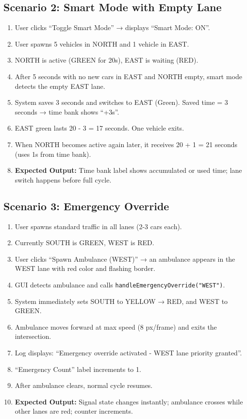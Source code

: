 \documentclass[12pt,a4paper]{article}
\begin{document}
\subsection{Scenario 2: Smart Mode with Empty Lane}
\begin{enumerate}
    \item User clicks ``Toggle Smart Mode'' → displays ``Smart Mode: ON''.
    \item User spawns 5 vehicles in NORTH and 1 vehicle in EAST.
    \item NORTH is active (GREEN for 20s), EAST is waiting (RED).
    \item After 5 seconds with no new cars in EAST and NORTH empty, smart mode detects the empty EAST lane.
    \item System saves 3 seconds and switches to EAST (Green). Saved time = 3 seconds → time bank shows ``+3s''.
    \item EAST green lasts 20 - 3 = 17 seconds. One vehicle exits.
    \item When NORTH becomes active again later, it receives 20 + 1 = 21 seconds (uses 1s from time bank).
    \item \textbf{Expected Output:} Time bank label shows accumulated or used time; lane switch happens before full cycle.
\end{enumerate}

\subsection{Scenario 3: Emergency Override}
\begin{enumerate}
    \item User spawns standard traffic in all lanes (2-3 cars each).
    \item Currently SOUTH is GREEN, WEST is RED.
    \item User clicks ``Spawn Ambulance (WEST)'' → an ambulance appears in the WEST lane with red color and flashing border.
    \item GUI detects ambulance and calls \texttt{handleEmergencyOverride("WEST")}.
    \item System immediately sets SOUTH to YELLOW → RED, and WEST to GREEN.
    \item Ambulance moves forward at max speed (8 px/frame) and exits the intersection.
    \item Log displays: ``Emergency override activated - WEST lane priority granted''.
    \item ``Emergency Count'' label increments to 1.
    \item After ambulance clears, normal cycle resumes.
    \item \textbf{Expected Output:} Signal state changes instantly; ambulance crosses while other lanes are red; counter increments.
\end{enumerate}
\end{document}
